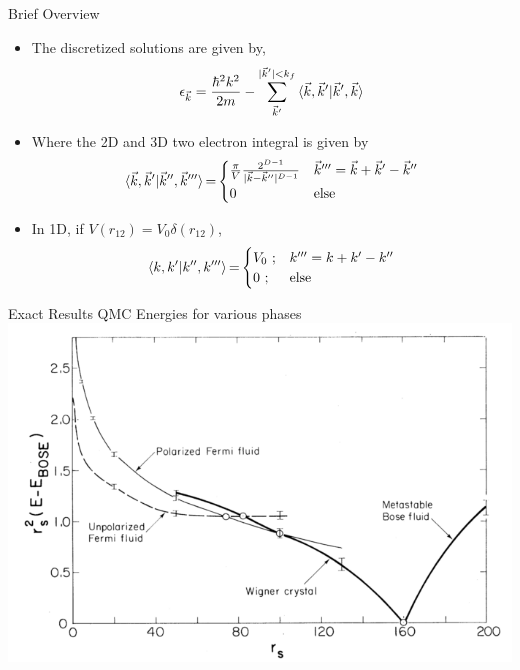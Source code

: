 \documentclass[10pt]{beamer}
\begin{document}
{{{{{{\begin{frame}{Brief Overview}
	\begin{itemize}
		\item{The discretized solutions are given by,
		\begin{eqnarray}\label{eq:hf_orb_energy}
			\epsilon_{\vec{k}}=
				\frac{\hbar^2 k^2}{2m} - \sum\limits_{\vec{k}'}^{|\vec{k}'|< k_f}
				\braket{\vec{k}, \vec{k}' |\vec{k}', \vec{k}}
		\end{eqnarray}
		}
		\item{Where the 2D and 3D two electron integral is given by
  		\begin{equation}
  			\braket{\vec{k}, \vec{k}'|\vec{k}'',\vec{k}'''}{=}
  				\begin{cases}
  				\frac{\pi}{V}\frac{2^{D-1}}{|\vec{k}-\vec{k}''|^{D-1}}
  				& \vec{k}''' = \vec{k}+\vec{k}'-\vec{k}'' \nonumber\\
  				0
  				& \text{else}
  				\end{cases}
  		\end{equation}
		}
		\item{ In 1D, if $V(r_{12}) = V_0\delta{(r_{12})}$,
		  \begin{equation}
  			\braket{k, k'|k'',k'''}{=}
  				\begin{cases}
  				V_0\text{ ;}
  				& k''' = k+k'-k'' \\
  				0\text{ ;}
  				& \text{else}
  				\end{cases}
		  \end{equation}
		}
	\end{itemize}
\end{frame}

{%

\begin{frame}{Exact Results}
  \centering
	QMC Energies for various phases
	\includegraphics[width=.85\linewidth]{../figures/Ceperley_PhaseDiag.png}
\end{frame}


}}}}}}}
\end{document}
